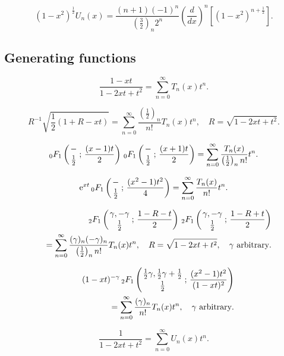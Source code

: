 \documentclass[envcountchap,graybox]{svmono}
\newcommand{\hyp}[5]{\mbox{}_{#1}{F}_{#2}
\left(\genfrac{}{}{0pt}{}{#3}{#4}\,;\,#5\right)}
\newcommand{\e}{\textrm{e}}
\begin{document}
\begin{equation}
\label{RodChebyshevII}
(1-x^2)^{\frac{1}{2}}U_n(x)=\frac{(n+1)(-1)^n}{(\frac{3}{2})_n2^n}
\left(\frac{d}{dx}\right)^n\left[(1-x^2)^{n+\frac{1}{2}}\right].
\end{equation}

\subsection*{Generating functions}
\begin{equation}
\label{GenChebyshevI1}
\frac{1-xt}{1-2xt+t^2}=\sum_{n=0}^{\infty}T_n(x)t^n.
\end{equation}

\begin{equation}
\label{GenChebyshevI2}
R^{-1}\sqrt{\frac{1}{2}(1+R-xt)}=\sum_{n=0}^{\infty}
\frac{\left(\frac{1}{2}\right)_n}{n!}T_n(x)t^n,\quad R=\sqrt{1-2xt+t^2}.
\end{equation}

\begin{equation}
\label{GenChebyshevI3}
\hyp{0}{1}{-}{\frac{1}{2}}{\frac{(x-1)t}{2}}\,
\hyp{0}{1}{-}{\frac{1}{2}}{\frac{(x+1)t}{2}}=
\sum_{n=0}^{\infty}\frac{T_n(x)}{\left(\frac{1}{2}\right)_nn!}t^n.
\end{equation}

\begin{equation}
\label{GenChebyshevI4}
\e^{xt}\,\hyp{0}{1}{-}{\frac{1}{2}}{\frac{(x^2-1)t^2}{4}}=
\sum_{n=0}^{\infty}\frac{T_n(x)}{n!}t^n.
\end{equation}

\begin{eqnarray}
\label{GenChebyshevI5}
& &\hyp{2}{1}{\gamma,-\gamma}{\frac{1}{2}}{\frac{1-R-t}{2}}\,
\hyp{2}{1}{\gamma,-\gamma}{\frac{1}{2}}{\frac{1-R+t}{2}}\nonumber\\
& &{}=\sum_{n=0}^{\infty}\frac{(\gamma)_n(-\gamma)_n}{\left(\frac{1}{2}\right)_nn!}T_n(x)t^n,
\quad R=\sqrt{1-2xt+t^2},\quad\textrm{$\gamma$ arbitrary}.
\end{eqnarray}

\begin{eqnarray}
\label{GenChebyshevI6}
& &(1-xt)^{-\gamma}\,\hyp{2}{1}{\frac{1}{2}\gamma,\frac{1}{2}\gamma+\frac{1}{2}}{\frac{1}{2}}
{\frac{(x^2-1)t^2}{(1-xt)^2}}\nonumber\\
& &=\sum_{n=0}^{\infty}\frac{(\gamma)_n}{n!}T_n(x)t^n,\quad\textrm{$\gamma$ arbitrary}.
\end{eqnarray}

\begin{equation}
\label{GenChebyshevII1}
\frac{1}{1-2xt+t^2}=\sum_{n=0}^{\infty}U_n(x)t^n.
\end{equation}
\end{document}
